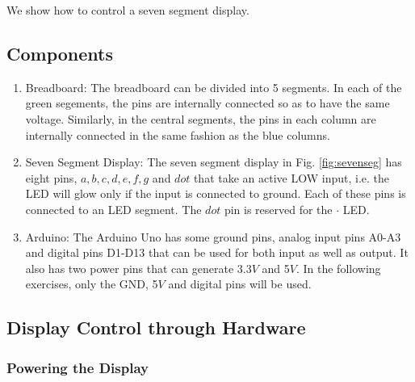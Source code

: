 \iffalse
\begin{enumerate}[label=\arabic*.,ref=\theenumi]
We show how to control
a seven segment display.
\subsection{Components}
\begin{enumerate}[label=\arabic*.,ref=\theenumi]
\begin{table}[!ht]

\caption{Components}
\label{table:components}
\end{table}
\item Breadboard:
The breadboard can be divided into 5 segments.  In each of the green segements, the pins are internally connected so as to have the same voltage.  Similarly, in the central segments, the pins in each column  are internally connected in the same fashion as the blue columns. 
\item Seven Segment Display:
The seven segment display in Fig. \ref{fig:sevenseg} has eight pins, $a, b, c, d, e, f, g$ and $dot$ that take an active LOW input, i.e.  the LED will glow only if the input is connected to ground.  Each of these pins is connected to an LED segment.  The $dot$ pin is  reserved for the $\cdot$ LED.  

\item Arduino:
The Arduino Uno has some ground pins, analog input pins A0-A3 and digital pins D1-D13 that can be used for both input as well as output. It also has two power pins that can generate 3.3$V$ and 5$V$.  In the following exercises, only the GND, 5$V$ and digital pins will be used.

\end{enumerate}

\subsection{Display Control through Hardware }
\subsubsection{Powering the Display}
\begin{enumerate}[label=\arabic*.,ref=\theenumi]


\end{enumerate}
\end{enumerate}
